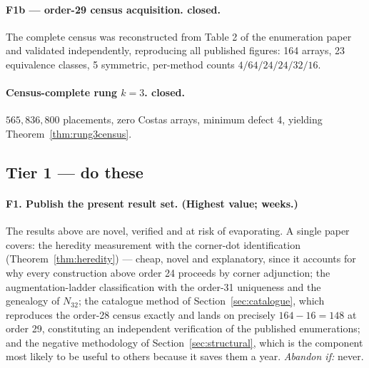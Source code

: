 \documentclass[11pt,a4paper]{article}
\theoremstyle{definition}
\begin{document}
\paragraph{F1b --- order-29 census acquisition. \textbf{closed}.} The complete
census was reconstructed from Table 2 of the enumeration paper and validated
independently, reproducing all published figures: 164 arrays, 23 equivalence
classes, 5 symmetric, per-method counts $4/64/24/24/32/16$.

\paragraph{Census-complete rung $k=3$. \textbf{closed}.} $565{,}836{,}800$
placements, zero Costas arrays, minimum defect 4, yielding
Theorem~\ref{thm:rung3census}.

\subsection*{Tier 1 --- do these}

\paragraph{F1. Publish the present result set. (Highest value; weeks.)}
The results above are novel, verified and at risk of evaporating. A single paper
covers: the heredity measurement with the corner-dot identification
(Theorem~\ref{thm:heredity}) --- cheap, novel and explanatory, since it accounts
for why every construction above order 24 proceeds by corner adjunction; the
augmentation-ladder classification with the order-31 uniqueness and the genealogy
of $N_{32}$; the catalogue method of Section~\ref{sec:catalogue}, which
reproduces the order-28 census exactly and lands on precisely $164-16=148$ at
order 29, constituting an independent verification of the published enumerations;
and the negative methodology of Section~\ref{sec:structural}, which is the
component most likely to be useful to others because it saves them a year.
\emph{Abandon if:} never.
\end{document}
